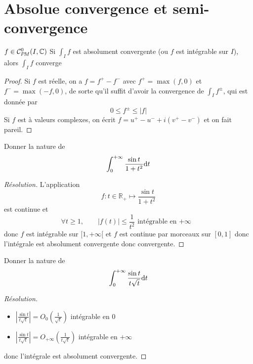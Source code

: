 \section{Absolue convergence et semi-convergence}

\begin{prop}
    \Hyp $f\in\CPM(I, \mathbb C)$
    \Conc Si $\displaystyle\int_If$ est absolument convergente (ou $f$ est intégrable sur $I$), alors $\displaystyle\int_If$ converge
\end{prop}

\begin{proof}
    Si $f$ est réelle, on a $f=f^+-f^-$ avec $f^+=\max(f,0)$ et $f^-=\max(-f,0)$, de sorte qu'il suffit d'avoir la convergence de $\displaystyle\int_If^\pm$, qui est donnée par \[
        0\leq f^\pm\leq |f|
    \]
    Si $f$ est à valeurs complexes, on écrit $f=u^+-u^-+i(v^+-v^-)$ et on fait pareil.
\end{proof}

\begin{exo}
    Donner la nature de \[
        \int_0^{+\infty}\frac{\sin t}{1+t^2}\mathrm{d} t
    \]
\end{exo}

\begin{proof}[Résolution]
    L'application \[
            f:t\in\mathbb R_+\longmapsto \frac{\sin t}{1+t^2}
    \]
    est continue et \[
        \forall t\geq 1, \qquad |f(t)|\leq \frac1{t^2}\text{ intégrable en $+\infty$ }
    \]
    donc $f$ est intégrable sur $[1, +\infty[$ et $f$ est continue par morceaux sur $[0, 1]$ donc l'intégrale est absolument convergente donc convergente.
\end{proof}

\begin{exo}
    Donner la nature de \[
        \int_0^{+\infty}\frac{\sin t}{t\sqrt t}\mathrm{d} t
    \]
\end{exo}

\begin{proof}[Résolution]~
    \begin{itemize}
        \item $\displaystyle \left| \frac{\sin t}{t\sqrt t} \right|=O_0 \left( \frac1{\sqrt t} \right)$ intégrable en $0$
        \item $\displaystyle \left| \frac{\sin t}{t\sqrt t} \right|=O_{+\infty} \left( \frac1{t\sqrt t} \right)$ intégrable en $+\infty$
    \end{itemize}
    donc l'intégrale est absolument convergente.
\end{proof}

